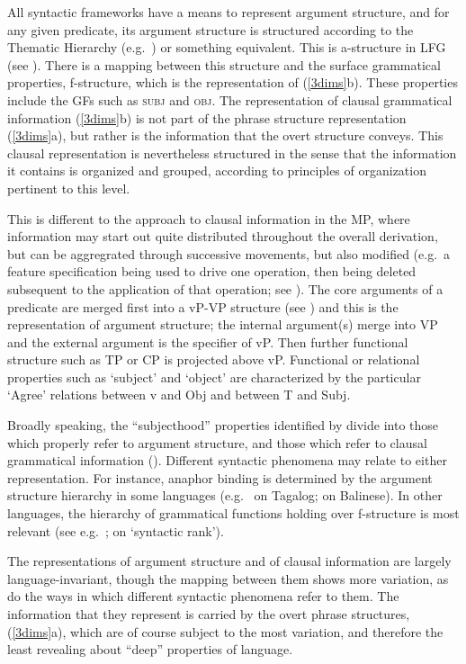 \documentclass[output=paper,hidelinks]{langscibook}
\begin{document}
All syntactic frameworks have a means to represent argument structure,
and for any given predicate, its argument structure is structured
according to the Thematic Hierarchy (e.g.~\citealp{jackendoff72}) or
something equivalent. This is a-structure in LFG (see
). There is a
mapping between this structure and the surface grammatical properties,
f-structure, which is the representation of (\ref{3dims}b). These
properties include the GFs such as \textsc{subj} and \textsc{obj}.
The representation of clausal grammatical information (\ref{3dims}b)
is not part of the phrase structure representation (\ref{3dims}a), but
rather is the information that the overt structure conveys. This
clausal representation is nevertheless structured in the sense that
the information it contains is organized and grouped, according to
principles of organization pertinent to this level.

This is different to the approach to clausal information in the MP,
where information may start out quite distributed throughout the
overall derivation, but can be aggregrated through successive
movements, but also modified (e.g.~a feature specification being used
to drive one operation, then being deleted subsequent to the
application of that operation; see
). The core arguments of a predicate
are merged first into a vP-VP structure (see
\citealp[315ff.]{chomsky1995the-minimalist}) and this is the
representation of argument structure; the internal argument(s) merge
into VP and the external argument is the specifier of vP. Then further
functional structure such as TP or CP is projected above vP.
Functional or relational properties such as `subject' and `object' are
characterized by the particular `Agree' relations between v and Obj
and between T and Subj.
  
Broadly speaking, the ``subjecthood'' properties identified by
\citet{keenan76} divide into those which properly refer to argument
structure, and those which refer to clausal grammatical information
(\citealp{Manning1996}). Different syntactic phenomena may relate to
either representation. For instance, anaphor binding is determined by
the argument structure hierarchy in some languages
(e.g.~\citealp{schachter76} on Tagalog; \citealp{wechslerarka} on
Balinese). In other languages, the hierarchy of grammatical functions
holding over f-structure is most relevant (see
e.g.~\citealp[212--213]{bresnan2001lexical};
\citealp[217]{BresnanEtAl2016} on `syntactic rank').

\hspace*{-.1pt}The representations of argument structure and of clausal information
are large\-ly langu\-age-invariant, though the mapping between them
shows more variation, as do the ways in which different syntactic
phenomena refer to them. The information that they represent is
carried by the overt phrase structures, (\ref{3dims}a), which are of
course subject to the most variation, and therefore the least
revealing about ``deep'' properties of language.
\end{document}
